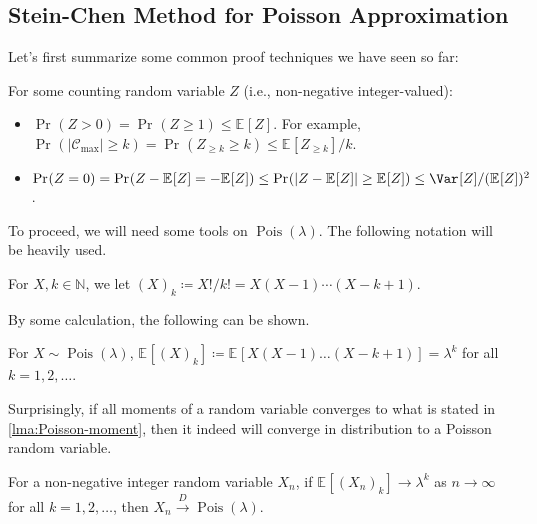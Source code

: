\subsection{Stein-Chen Method for Poisson Approximation}
Let's first summarize some common proof techniques we have seen so far:

\begin{prev}
	For some counting random variable \(Z\) (i.e., non-negative integer-valued):
	\begin{itemize}
		\item \(\Pr_{}(Z > 0) = \Pr_{}(Z \geq 1) \leq \mathbb{E}_{}[Z] \). For example, \(\Pr_{}(\lvert \mathcal{C} _{\max } \rvert \geq k) = \Pr_{}(Z_{\geq k} \geq k) \leq \mathbb{E}_{}[Z_{\geq k}] / k\).
		\item \(\Pr_{}(Z = 0) = \Pr_{}(Z - \mathbb{E}_{}[Z] = - \mathbb{E}_{}[Z] ) \leq \Pr_{}(\lvert Z - \mathbb{E}_{}[Z] \rvert \geq \mathbb{E}_{}[Z] ) \leq \Var_{}[Z] / (\mathbb{E}_{}[Z] )^2\).
	\end{itemize}
\end{prev}

To proceed, we will need some tools on \(\operatorname{Pois}(\lambda ) \). The following notation will be heavily used.

\begin{notation}
	For \(X, k \in \mathbb{N} \), we let \((X)_k \coloneqq X! / k! = X (X-1) \cdots (X-k+1)\).
\end{notation}

By some calculation, the following can be shown.

\begin{lemma}\label{lma:Poisson-moment}
	For \(X \sim \operatorname{Pois}(\lambda ) \), \(\mathbb{E}_{}[(X)_k] \coloneqq \mathbb{E}_{}[X (X - 1) \dots (X-k+1)] = \lambda ^k\) for all \(k = 1, 2, \dots \).
\end{lemma}

Surprisingly, if all moments of a random variable converges to what is stated in \autoref{lma:Poisson-moment}, then it indeed will converge in distribution to a Poisson random variable.

\begin{lemma}\label{lma:Poisson-moment-convergence}
	For a non-negative integer random variable \(X_n\), if \(\mathbb{E}_{}[(X_n)_k] \to \lambda ^k\) as \(n \to \infty \) for all \(k = 1, 2, \dots \), then \(X_n \overset{D}{\to} \operatorname{Pois}(\lambda ) \).
\end{lemma}

